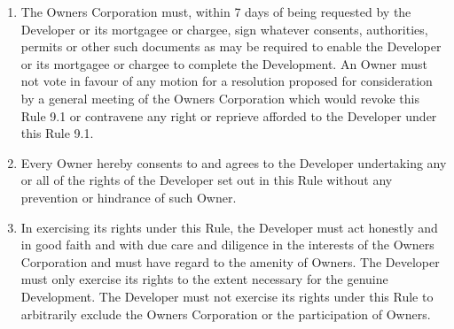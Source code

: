 \documentclass{article}
\begin{document}
\begin{enumerate}[label=\arabic*.]
\begin{enumerate}[label=\arabic{enumi}.\arabic*.]
\begin{enumerate}[label=\arabic{enumi}.\arabic*.]
\begin{enumerate}[label=(\arabic*)]
\begin{enumerate}[label=(\alph*)]
\item  erect for sale promotional advertising or other signs as the Developer may require on any part of the Common Property; and

\item  grant rights to use or access through or over the Common Property to third parties on such terms and conditions as the Developer or its mortgagee or chargee thinks fit; and

\item  limit or restrict access to certain areas of the Development including areas of the Common Property in order to expeditiously complete the Development; and

\item  use whatever rights of way and/or points of egress and ingress to the Development as necessary to carry out any works and to block for whatever periods are necessary any rights of way or points of egress and ingress to the Development in order to carry out any works provided that the Developer and any third party authorised by it under this Rule or any party to which it assigns all or part of the benefits of its rights under this Rule, uses its best endeavours to minimise disturbance and inconvenience to others occupying or using the Common Property.

\end{enumerate}

\item  The Owners Corporation must, within 7 days of being requested by the Developer or its mortgagee or chargee, sign whatever consents, authorities, permits or other such documents as may be required to enable the Developer or its mortgagee or chargee to complete the Development. An Owner must not vote in favour of any motion for a resolution proposed for consideration by a general meeting of the Owners Corporation which would revoke this Rule 9.1 or contravene any right or reprieve afforded to the Developer under this Rule 9.1.

\item  Every Owner hereby consents to and agrees to the Developer undertaking any or all of the rights of the Developer set out in this Rule without any prevention or hindrance of such Owner.

\item  In exercising its rights under this Rule, the Developer must act honestly and in good faith and with due care and diligence in the interests of the Owners Corporation and must have regard to the amenity of Owners. The Developer must only exercise its rights to the extent necessary for the genuine Development. The Developer must not exercise its rights under this Rule to arbitrarily exclude the Owners Corporation or the participation of Owners.


\end{enumerate}
\end{enumerate}
\end{enumerate}
\end{enumerate}
\end{document}

